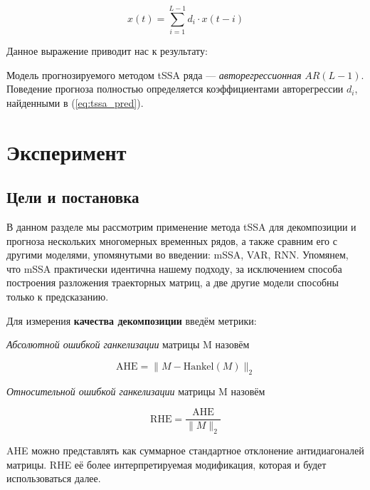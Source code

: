 	    	 \begin{equation*}\label{eq:autoregr}
	    	 	x(t) = \sum\limits_{i = 1}^{L - 1} d_i \cdot x(t - i)
	    	 \end{equation*}
	    	 
	    	 Данное выражение приводит нас к результату:
	    	 
	    	 \begin{Th}
	    	 	Модель прогнозируемого методом tSSA ряда --- \textit{авторегрессионная} $ AR(L - 1) $. Поведение прогноза полностью определяется коэффициентами авторегрессии $ d_i $, найденными в (\ref{eq:tssa_pred}).
	    	 \end{Th}
	    
	\section{Эксперимент}	
	
		\subsection*{Цели и постановка}
	
			В данном разделе мы рассмотрим применение метода tSSA для декомпозиции и прогноза нескольких многомерных временных рядов, а также сравним его с другими моделями, упомянутыми во введении: mSSA, VAR, RNN. Упомянем, что mSSA практически идентична нашему подходу, за исключением способа построения разложения траекторных матриц, а две другие модели способны только к предсказанию.
		
			Для измерения \textbf{качества декомпозиции} введём метрики:
			
			\begin{Def}
				\emph{Абсолютной ошибкой ганкелизации} матрицы M назовём 
				
				\[
					\text{AHE} = \lVert M - \text{Hankel}(M) \rVert_2
				\] 
				
			\end{Def}	
			
			\begin{Def}		
				
				\emph{Относительной ошибкой ганкелизации} матрицы M назовём 
				
				\[
				\text{RHE} = \frac{\text{AHE}}{\lVert M \rVert_2} 
				\] 		
				
			\end{Def}
			
			AHE можно представлять как суммарное стандартное отклонение антидиагоналей матрицы. RHE её более интерпретируемая модификация, которая и будет использоваться далее. 
			
